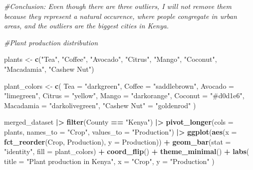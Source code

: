\documentclass[
]{article}
\newenvironment{Shaded}{\begin{snugshade}}{\end{snugshade}}
\newcommand{\AttributeTok}[1]{\textcolor[rgb]{0.13,0.29,0.53}{#1}}
\newcommand{\CommentTok}[1]{\textcolor[rgb]{0.56,0.35,0.01}{\textit{#1}}}
\newcommand{\FunctionTok}[1]{\textcolor[rgb]{0.13,0.29,0.53}{\textbf{#1}}}
\newcommand{\NormalTok}[1]{#1}
\newcommand{\OtherTok}[1]{\textcolor[rgb]{0.56,0.35,0.01}{#1}}
\newcommand{\SpecialCharTok}[1]{\textcolor[rgb]{0.81,0.36,0.00}{\textbf{#1}}}
\newcommand{\StringTok}[1]{\textcolor[rgb]{0.31,0.60,0.02}{#1}}
\begin{document}
\begin{Shaded}
\begin{Highlighting}[]
\CommentTok{\#Conclusion: Even though there are three outliers, I will not remove them because they represent a natural occurence, where people congregate in urban areas, and the outliers are the biggest cities in Kenya.}

\CommentTok{\#Plant production distribution}

\NormalTok{plants }\OtherTok{\textless{}{-}} \FunctionTok{c}\NormalTok{(}\StringTok{"Tea"}\NormalTok{, }\StringTok{"Coffee"}\NormalTok{, }\StringTok{"Avocado"}\NormalTok{, }\StringTok{"Citrus"}\NormalTok{, }\StringTok{"Mango"}\NormalTok{, }\StringTok{"Coconut"}\NormalTok{, }\StringTok{"Macadamia"}\NormalTok{, }\StringTok{"Cashew Nut"}\NormalTok{)}

\NormalTok{plant\_colors }\OtherTok{\textless{}{-}} \FunctionTok{c}\NormalTok{(}
  \AttributeTok{Tea =} \StringTok{"darkgreen"}\NormalTok{,}
  \AttributeTok{Coffee =} \StringTok{"saddlebrown"}\NormalTok{,}
  \AttributeTok{Avocado =} \StringTok{"limegreen"}\NormalTok{,}
  \AttributeTok{Citrus =} \StringTok{"yellow"}\NormalTok{,}
  \AttributeTok{Mango =} \StringTok{"darkorange"}\NormalTok{,}
  \AttributeTok{Coconut =} \StringTok{"\#d0d1e6"}\NormalTok{,}
  \AttributeTok{Macadamia =} \StringTok{"darkolivegreen"}\NormalTok{,}
  \StringTok{"Cashew Nut"} \OtherTok{=} \StringTok{"goldenrod"}
\NormalTok{)}

\NormalTok{merged\_dataset }\SpecialCharTok{|\textgreater{}} 
  \FunctionTok{filter}\NormalTok{(County }\SpecialCharTok{==} \StringTok{"Kenya"}\NormalTok{) }\SpecialCharTok{|\textgreater{}} 
  \FunctionTok{pivot\_longer}\NormalTok{(}\AttributeTok{cols =}\NormalTok{ plants, }\AttributeTok{names\_to =} \StringTok{"Crop"}\NormalTok{, }\AttributeTok{values\_to =} \StringTok{"Production"}\NormalTok{) }\SpecialCharTok{|\textgreater{}} 
  \FunctionTok{ggplot}\NormalTok{(}\FunctionTok{aes}\NormalTok{(}\AttributeTok{x =} \FunctionTok{fct\_reorder}\NormalTok{(Crop, Production), }\AttributeTok{y =}\NormalTok{ Production)) }\SpecialCharTok{+}
  \FunctionTok{geom\_bar}\NormalTok{(}\AttributeTok{stat =} \StringTok{"identity"}\NormalTok{, }\AttributeTok{fill =}\NormalTok{ plant\_colors) }\SpecialCharTok{+}
  \FunctionTok{coord\_flip}\NormalTok{() }\SpecialCharTok{+}
  \FunctionTok{theme\_minimal}\NormalTok{() }\SpecialCharTok{+}
  \FunctionTok{labs}\NormalTok{(}
    \AttributeTok{title =} \StringTok{"Plant production in Kenya"}\NormalTok{,}
    \AttributeTok{x =} \StringTok{"Crop"}\NormalTok{,}
    \AttributeTok{y =} \StringTok{"Production"}
\NormalTok{  )}
\end{Highlighting}
\end{Shaded}
\end{document}
